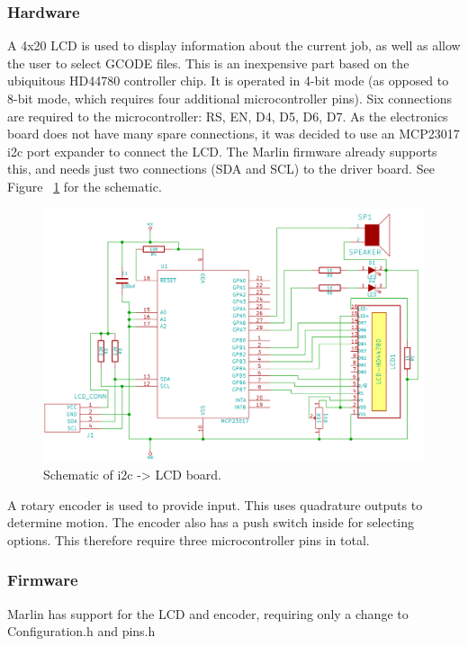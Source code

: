 \subsubsection{Hardware}
A 4x20 LCD is used to display information about the current job, as well as allow the user to select GCODE files. This is an inexpensive part based on the ubiquitous HD44780 controller chip.
It is operated in 4-bit mode (as opposed to 8-bit mode, which requires four additional microcontroller pins). Six connections are required to the microcontroller: RS, EN, D4, D5, D6, D7. As
the electronics board does not have many spare connections, it was decided to use an MCP23017 i2c port expander to connect the LCD. The Marlin firmware already supports this, and needs just
two connections (SDA and SCL) to the driver board. See Figure ~\ref{lcd_backpack} for the schematic.

\begin{figure}[ht!]
\centering
\includegraphics[width=160mm]{resources/lcd_backpack.png}
\caption{Schematic of i2c -> LCD board.}
\label{lcd_backpack}
\end{figure}

A rotary encoder is used to provide input. This uses quadrature outputs to determine motion. The encoder also has a push switch inside for selecting options. This therefore require three microcontroller
pins in total.

\subsubsection{Firmware}
Marlin has support for the LCD and encoder, requiring only a change to Configuration.h and pins.h


